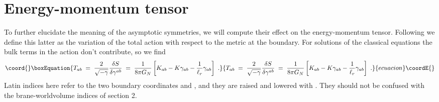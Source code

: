 \documentclass[a4paper,12pt,oneside]{article}
\begin{document}

\setcounter{equation}{0}
\section{Energy-momentum tensor}

To further elucidate the meaning of the asymptotic  symmetries,
we will compute their effect  on  the 
energy-momentum tensor. Following \cite{BY, BK} we define this latter
 as the variation of the total action with respect to
the  metric at the boundary. For solutions of the classical equations
the bulk terms  in the action don't  contribute,
so we  find  
\begin{equation}\coord{}\boxEquation{
T_{ab}\;  =\;  {2\over \sqrt{-\gamma}}
 {\delta S\over \delta\gamma^{ab}}\;  =\;   {1\over 8\pi G_N}
\left[ K_{ab} - K \gamma_{ab} - {1\over \ell_{r}}\gamma_{ab}\right]  \ .
\label{emtensor}
}{
T_{ab}\;  =\;  {2\over \sqrt{-\gamma}}
 {\delta S\over \delta\gamma^{ab}}\;  =\;   {1\over 8\pi G_N}
\left[ K_{ab} - K \gamma_{ab} - {1\over \ell_{r}}\gamma_{ab}\right]  \ .
}{ecuacion}\coordE{}\end{equation}
Latin indices here refer to the two boundary coordinates \coordHE{} and \coordHE{}, and
they are  raised and lowered with \myHighlight{$\gamma$}\coordHE{}. They should not be confused with
the  brane-worldvolume indices of section 2.
\end{document}
